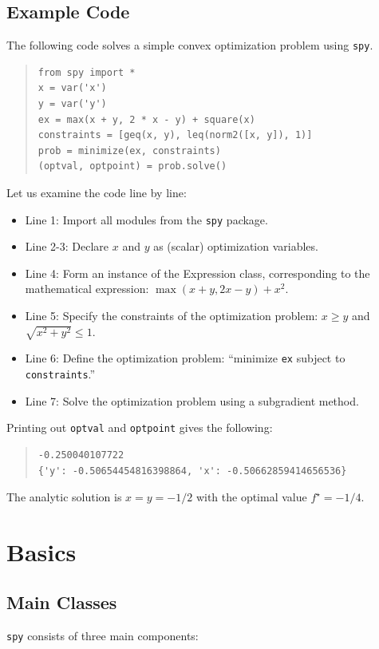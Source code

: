 \documentclass[12pt]{article}
\begin{document}
\subsection{Example Code}
The following code solves a simple convex optimization problem using \verb'spy'.

\begin{quote}
\begin{verbatim}
from spy import *
x = var('x')
y = var('y')
ex = max(x + y, 2 * x - y) + square(x)
constraints = [geq(x, y), leq(norm2([x, y]), 1)]
prob = minimize(ex, constraints)
(optval, optpoint) = prob.solve()
\end{verbatim}
\end{quote}

\noindent Let us examine the code line by line:

\begin{itemize}
\item Line 1: Import all modules from the \verb'spy' package.
\item Line 2-3: Declare $x$ and $y$ as (scalar) optimization variables.
\item Line 4: Form an instance of the Expression class, corresponding to the mathematical expression: $\max(x+y,2x-y)+x^2$.
\item Line 5: Specify the constraints of the optimization problem: $x \geq y$ and $\sqrt{x^2+y^2} \leq 1$.
\item Line 6: Define the optimization problem: ``minimize \verb'ex' subject to \verb'constraints'.''
\item Line 7: Solve the optimization problem using a subgradient method.
\end{itemize}

\noindent Printing out \verb'optval' and \verb'optpoint' gives the following:

\begin{quote}
\begin{verbatim}
-0.250040107722
{'y': -0.50654454816398864, 'x': -0.50662859414656536}
\end{verbatim}
\end{quote}

\noindent The analytic solution is $x=y=-1/2$ with the optimal value $f^\star = -1/4$.

\section{Basics}

\subsection{Main Classes}
\verb'spy' consists of three main components:
\end{document}
